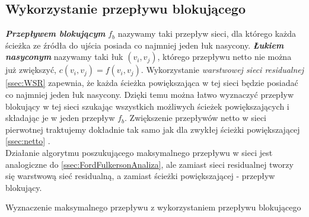 \subsection{Wykorzystanie przepływu blokującego}\label{ssec:blockingFlowAnaliza}
\textbf{\textit{Przepływem blokującym}} $ f_b $ nazywamy taki przepływ sieci, dla którego każda ścieżka ze źródła do ujścia posiada co najmniej jeden łuk nasycony. \textbf{\textit{Łukiem nasyconym}} nazywamy taki łuk $ (v_i,v_j) $, którego przepływu netto nie można już zwiększyć, $ c(v_i,v_j)=f(v_i,v_j) $. Wykorzystanie \textit{warstwowej sieci residualnej} \ref{ssec:WSR} zapewnia, że każda ścieżka powiększająca w tej sieci będzie posiadać co najmniej jeden łuk nasycony. Dzięki temu można łatwo wyznaczyć przepływ blokujący w tej sieci szukając wszystkich możliwych ścieżek powiększających i składając je w jeden przepływ $ f_b $. Zwiększenie przepływów netto w sieci pierwotnej traktujemy dokładnie tak samo jak dla zwykłej ścieżki powiększającej \ref{ssec:netto} \cite{id:ZaawansowaneAlgorytmyWarstwowaSiec}.\\\indent
Działanie algorytmu poszukującego maksymalnego przepływu w sieci jest analogiczne do  \ref{ssec:FordFulkersonAnaliza}, ale zamiast sieci residualnej tworzy się warstwową sieć residualną, a zamiast ścieżki powiększającej - przepływ blokujący.
\begin{algorithm}[H]
	\caption{Wyznaczenie maksymalnego przepływu z wykorzystaniem przepływu blokującego} \label{blockingFlowPseudo}
	\begin{algorithmic}
		\EndWhile\space
		\EndProcedure
	\end{algorithmic}
\end{algorithm}
